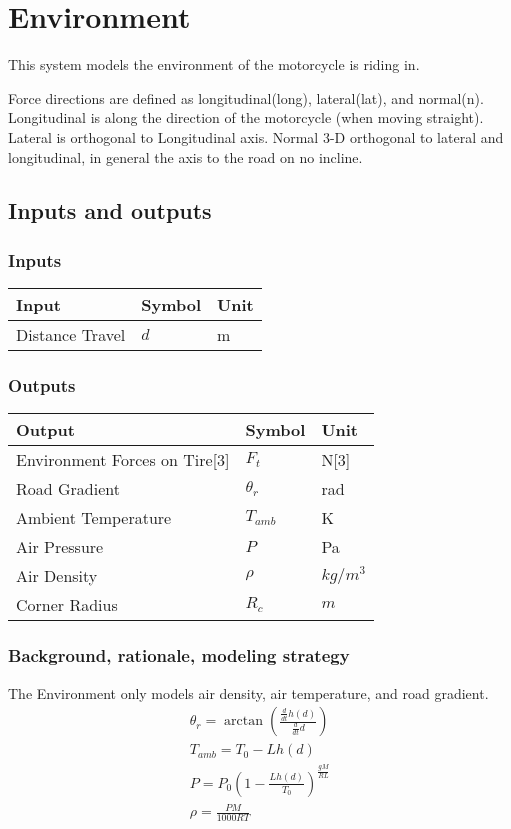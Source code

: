 \documentclass[../SimBALink.tex]{subfiles}
\begin{document}
\section{Environment} This system models the environment of the motorcycle is riding in.

Force directions are defined as longitudinal(long), lateral(lat), and normal(n). Longitudinal is along the direction of the motorcycle (when moving straight). Lateral is orthogonal to Longitudinal axis. Normal 3-D orthogonal to lateral and longitudinal, in general the axis to the road on no incline.

\subsection{Inputs and outputs}
	\subsubsection{Inputs}
	\begin{tabular}{ l | l | l  }
		Input					&	Symbol		&	Unit		\\	\hline
		Distance Travel			&	$d$			&	m
	\end{tabular}
	
	\subsubsection{Outputs}
	\begin{tabular}{ l | l | l  }
		Output								&	Symbol		&	Unit		\\	\hline
		Environment Forces on Tire[3]		&	$F_t$		&	N[3] \\
		Road Gradient						&	$\theta_r$	&	rad \\
		Ambient Temperature					&	$T_{amb}$	&  K \\
		Air Pressure						&	$P$  		& Pa \\
		Air Density 						&	$\rho$		& $kg/m^3$ \\
		Corner Radius 						&	$R_c$		& $m$
	\end{tabular}

\subsubsection{Background, rationale, modeling strategy}
The Environment only models air density, air temperature, and road gradient.
	\begin{gather}
		\theta_r  = \arctan\left(\frac{\frac{d}{dt} h(d)}{\frac{d}{dt} d}\right) \\
		T_{amb} = T_0 - L h(d) \\
		P = P_0 \left( 1 - \frac{L h(d)}{T_0} \right)^{\frac{gM}{RL}}\\
		\rho = \frac{PM}{1000RT}  
\end{gather}
\end{document}
